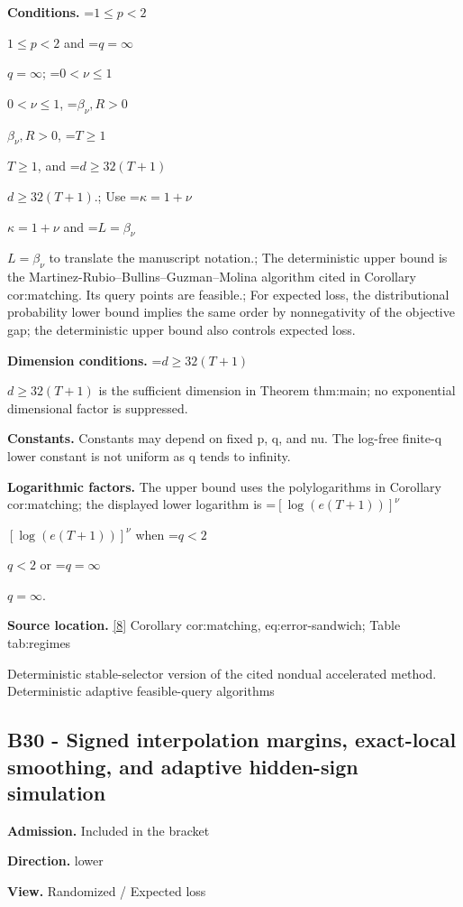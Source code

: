 \documentclass[10pt,a4paper]{article}
\newcommand{\AtlasMath}[1]{\par\begingroup\centering\setbox0=\hbox{$\displaystyle #1$}\ifdim\wd0>1.4\linewidth\typeout{ATLAS WIDE FORMULA: \the\wd0}\fi\ifdim\wd0>\linewidth\resizebox{\linewidth}{!}{\box0}\else\box0\fi\par\endgroup}
\newcommand{\AtlasInlineMath}[1]{\begingroup\setbox0=\hbox{$#1$}\ifdim\wd0>.4\linewidth\endgroup\AtlasMath{#1}\else\endgroup$#1$\fi}
\begin{document}
\textbf{Conditions.} \AtlasInlineMath{1\le p<2} and \AtlasInlineMath{q=\infty}; \AtlasInlineMath{0<\nu\le1}, \AtlasInlineMath{\beta_\nu,R>0}, \AtlasInlineMath{T\ge1}, and \AtlasInlineMath{d\ge32(T+1)}.; Use \AtlasInlineMath{\kappa=1+\nu} and \AtlasInlineMath{L=\beta_\nu} to translate the manuscript notation.; The deterministic upper bound is the Martinez-Rubio--Bullins--Guzman--Molina algorithm cited in Corollary cor:matching. Its query points are feasible.; For expected loss, the distributional probability lower bound implies the same order by nonnegativity of the objective gap; the deterministic upper bound also controls expected loss.



\textbf{Dimension conditions.} \AtlasInlineMath{d\ge32(T+1)} is the sufficient dimension in Theorem thm:main; no exponential dimensional factor is suppressed.



\textbf{Constants.} Constants may depend on fixed p, q, and nu. The log-free finite-q lower constant is not uniform as q tends to infinity.



\textbf{Logarithmic factors.} The upper bound uses the polylogarithms in Corollary cor:matching; the displayed lower logarithm is \AtlasInlineMath{[\log(e(T+1))]^\nu} when \AtlasInlineMath{q<2} or \AtlasInlineMath{q=\infty}.



\textbf{Source location.} \href{https://github.com/WU-Wendao/Colombo/blob/main/colombo_sensorium/Complexity_altas/data/sources/colombo/B1/manuscript.pdf}{[8]} Corollary cor:matching, eq:error-sandwich; Table tab:regimes



Deterministic stable-selector version of the cited nondual accelerated method. Deterministic adaptive feasible-query algorithms



\subsection{B30 - Signed interpolation margins, exact-local smoothing, and adaptive hidden-sign simulation}


\textbf{Admission.} Included in the bracket



\textbf{Direction.} lower



\textbf{View.} Randomized / Expected loss
\end{document}
